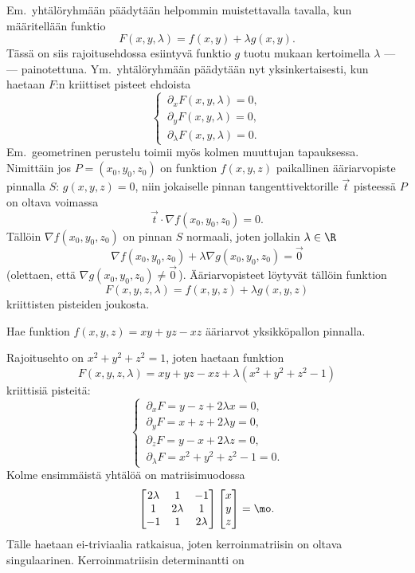 Em.\ yhtälöryhmään päädytään helpommin muistettavalla tavalla, kun määritellään funktio
\[
F(x,y,\lambda)=f(x,y)+\lambda g(x,y).
\]
Tässä on siis rajoitusehdossa esiintyvä funktio $g$ tuotu mukaan kertoimella $\lambda$ ---
 --- painotettuna. Ym.\ yhtälöryhmään päädytään nyt yksinkertaisesti,
kun haetaan $F$:n kriittiset pisteet ehdoista
\[
\begin{cases}
\,\partial_x F(x,y,\lambda)=0, \\
\,\partial_y F(x,y,\lambda)=0, \\
\,\partial_\lambda F(x,y,\lambda)=0.
\end{cases}
\]
Em.\ geometrinen perustelu toimii myös kolmen muuttujan tapauksessa. Nimittäin jos 
$P=(x_0,y_0,z_0)$ on funktion $f(x,y,z)$ paikallinen ääriarvopiste pinnalla $S:\,g(x,y,z)=0$,
niin jokaiselle pinnan tangenttivektorille $\vec t$ pisteessä $P$ on oltava voimassa
\[
\vec t\cdot\nabla f(x_0,y_0,z_0)=0.
\]
Tällöin $\nabla f(x_0,y_0,z_0)$ on pinnan $S$ normaali, joten jollakin $\lambda\in\R$
\[
\nabla f(x_0,y_0,z_0)+\lambda\nabla g(x_0,y_0,z_0)=\vec 0
\]
(olettaen, että $\nabla g(x_0,y_0,z_0)\neq\vec 0\,$). Ääriarvopisteet löytyvät tällöin funktion
\[
F(x,y,z,\lambda)=f(x,y,z)+\lambda g(x,y,z)
\]
kriittisten pisteiden joukosta.
\begin{Exa}
Hae funktion $f(x,y,z)=xy+yz-xz$ ääriarvot yksikköpallon pinnalla.
\end{Exa}
\ratk Rajoitusehto on $x^2+y^2+z^2=1$, joten haetaan funktion
\[
F(x,y,z,\lambda)=xy+yz-xz+\lambda(x^2+y^2+z^2-1)
\]
kriittisiä pisteitä:
\[
\begin{cases}
\,\partial_x F =y-z+2\lambda x = 0, \\
\,\partial_y F =x+z+2\lambda y = 0, \\
\,\partial_z F =y-x+2\lambda z = 0, \\
\,\partial_\lambda F =x^2+y^2+z^2-1 = 0.
\end{cases}
\]
Kolme ensimmäistä yhtälöä on matriisimuodossa
\[
\begin{bmatrix} 2\lambda & 1 & -1 \\ 1 & 2\lambda & 1 \\ -1 & 1 & 2\lambda \end{bmatrix}
\begin{bmatrix} x \\ y \\ z \end{bmatrix}=\mo.
\]
Tälle haetaan ei-triviaalia ratkaisua, joten kerroinmatriisin on oltava singulaarinen. 
Kerroinmatriisin determinantti on
